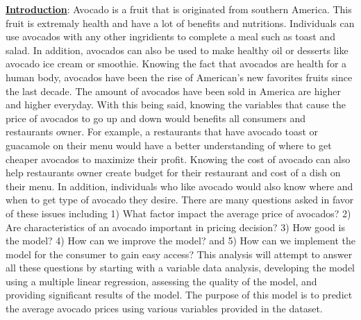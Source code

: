 \documentclass[11pt]{article}\usepackage[]{graphicx}\usepackage[]{color}
\begin{document}
\noindent\textbf{\underline{Introduction}}: Avocado is a fruit that is originated from southern America. This fruit is extremaly health and have a lot of benefits and nutritions. Individuals can use avocados with any other ingridients to complete a meal such as toast and salad. In addition, avocados can also be used to make healthy oil or desserts like avocado ice cream or smoothie. Knowing the fact that avocados are health for a human body, avocados have been the rise of American's new favorites fruits since the last decade. The amount of avocados have been sold in America are higher and higher everyday. With this being said, knowing the variables that cause the price of avocados to go up and down would benefits all consumers and restaurants owner. For example, a restaurants that have avocado toast or guacamole on their menu would have a better understanding of where to get cheaper avocados to maximize their profit. Knowing the cost of avocado can also help restaurants owner create budget for their restaurant and cost of a dish on their menu. In addition, individuals who like avocado would also know where and when to get type of avocado they desire. There are many questions asked in favor of these issues including 1) What factor impact the average price of avocados? 2) Are characteristics of an avocado important in pricing decision? 3) How good is the model? 4) How can we improve the model? and 5) How can we implement the model for the consumer to gain easy access? This analysis will attempt to answer all these questions by starting with a variable data analysis, developing the model using a multiple linear regression, assessing the quality of the model, and providing significant results of the model. The purpose of this model is to predict the average avocado prices using various variables provided in the dataset.         
\hfill \break
\end{document}
